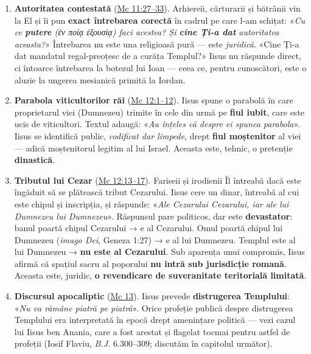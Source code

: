 \documentclass[12pt,a4paper,twoside,openany]{book}
\begin{document}
\begin{enumerate}
  \item \textbf{Autoritatea contestată} (\href{https://bibliaortodoxa.ro/carte.php?id=53\&cap=11\#27}{Mc 11:27--33}). Arhiereii, cărturarii și bătrânii vin la El și îi pun \textbf{exact întrebarea corectă} în cadrul pe care l-am schițat: «\textit{Cu ce \textbf{putere} (ἐν ποίᾳ ἐξουσίᾳ) faci acestea? Și \textbf{cine Ți-a dat} autoritatea aceasta?}» Întrebarea nu este una religioasă pură — este \textit{juridică}. «Cine Ți-a dat mandatul regal-preoțesc de a curăța Templul?» Iisus nu răspunde direct, ci întoarce întrebarea la botezul lui Ioan — ceea ce, pentru cunoscători, este o aluzie la ungerea mesianică primită la Iordan.
  \item \textbf{Parabola viticultorilor răi} (\href{https://bibliaortodoxa.ro/carte.php?id=53\&cap=12\#1}{Mc 12:1--12}). Iisus spune o parabolă în care proprietarul viei (Dumnezeu) trimite în cele din urmă pe \textbf{fiul iubit}, care este ucis de viticultori. Textul adaugă: «\textit{Au înțeles că despre ei spunea parabola}». Iisus se identifică public, \textit{codificat dar limpede}, drept \textbf{fiul moștenitor} al viei — adică moștenitorul legitim al lui Israel. Aceasta este, tehnic, o pretenție \textbf{dinastică}.
  \item \textbf{Tributul lui Cezar} (\href{https://bibliaortodoxa.ro/carte.php?id=53\&cap=12\#13}{Mc 12:13--17}). Fariseii și irodienii Îl întreabă dacă este îngăduit să se plătească tribut Cezarului. Iisus cere un dinar, întreabă al cui este chipul și inscripția, și răspunde: «\textit{Ale Cezarului Cezarului, iar ale lui Dumnezeu lui Dumnezeu}». Răspunsul pare politicos, dar este \textbf{devastator}: banul poartă chipul Cezarului → e al Cezarului. Omul poartă chipul lui Dumnezeu (\textit{imago Dei}, Geneza 1:27) → e al lui Dumnezeu. Templul este al lui Dumnezeu → \textbf{nu este al Cezarului}. Sub aparența unui compromis, Iisus afirmă că spațiul sacru al poporului \textbf{nu intră sub jurisdicție romană}. Aceasta este, juridic, \textbf{o revendicare de suveranitate teritorială limitată}.
  \item \textbf{Discursul apocaliptic} (\href{https://bibliaortodoxa.ro/carte.php?id=53\&cap=13\#1}{Mc 13}). Iisus prevede \textbf{distrugerea Templului}: «\textit{Nu va rămâne piatră pe piatră}». Orice profeție publică despre distrugerea Templului era interpretată în epocă drept amenințare politică — vezi cazul lui Iisus ben Anania, care a fost arestat și flagelat tocmai pentru astfel de profeții (Iosif Flaviu, \textit{B.J.} 6.300--309; discutăm în capitolul următor).

\end{enumerate}
\end{document}
